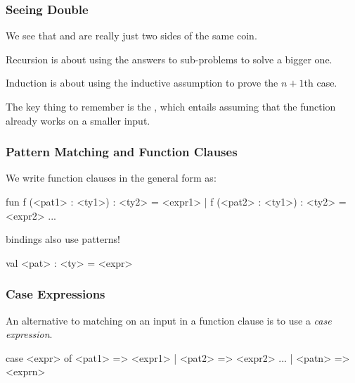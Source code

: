 \documentclass[aspectratio=169]{beamer}
\begin{document}
\begin{frame}[fragile]
  \frametitle{Seeing Double} 

  We see that  and  are really just two sides of the same coin.

  \vspace{\fill}

  Recursion is about using the answers to sub-problems to solve a bigger one.

  \vspace{\fill}

  Induction is about using the inductive assumption to prove the $n + 1$th case.

  \vspace{\fill}

  The key thing to remember is the , which entails
  assuming that the function already works on a smaller input.
\end{frame}


\begin{frame}[fragile]
  \frametitle{Pattern Matching and Function Clauses}

  We write function clauses in the general form as:
  
  \begin{codeblock}
    fun f (<pat1> : <ty1>) : <ty2> = <expr1> 
      | f (<pat2> : <ty1>) : <ty2> = <expr2>
      ...
  \end{codeblock}

  \vspace{\fill}

   bindings also use patterns!

  \begin{codeblock}
    val <pat> : <ty> = <expr>
  \end{codeblock}
\end{frame}

\begin{frame}[fragile]
  \frametitle{Case Expressions}

  An alternative to matching on an input in a function clause is to
  use a \textit{case expression}.

  \begin{codeblock}
    case <expr> of
      <pat1> => <expr1>
    | <pat2> => <expr2>
    ...
    | <patn> => <exprn> 
  \end{codeblock}

  \vspace{\fill}

\end{frame}
\end{document}
